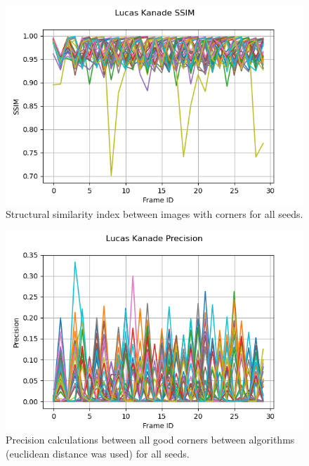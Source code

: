 \documentclass[11pt, conference, letterpaper]{IEEEtran}
\begin{document}
\begin{figure}[h!]
    \centering
    \includegraphics[width=\linewidth]{mc_images/mc_lk_ssim.png}
    \caption{Structural similarity index between images with corners for all seeds.}
    \label{fig:mc_lk_ssim}
\end{figure}

\begin{figure}[h!]
    \centering
    \includegraphics[width=\linewidth]{mc_images/mc_lk_precision.png}
    \caption{Precision calculations between all good corners between algorithms (euclidean distance was used) for all seeds.}
    \label{fig:mc_lk_prec}
\end{figure}
\end{document}
